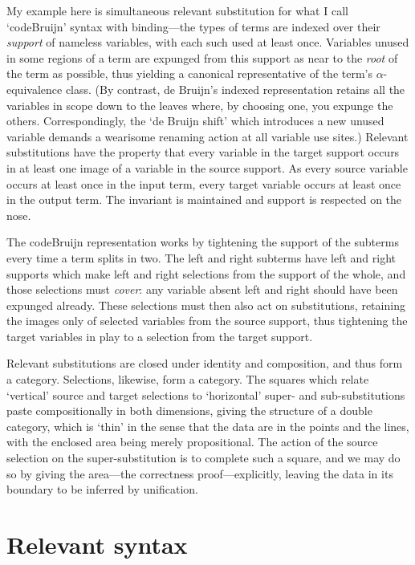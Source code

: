 \documentclass[orivec]{jfp}
\begin{document}
My example here is simultaneous relevant substitution for what I call
`codeBruijn' syntax with binding---the types of terms are indexed over
their \emph{support} of nameless variables, with each such used at
least once. Variables unused in some regions of a term are expunged
from this support as near to the \emph{root} of the term as possible,
thus yielding a canonical representative of the term's
$\alpha$-equivalence class. (By contrast, de Bruijn's indexed
representation retains all the variables in scope down to the leaves
where, by choosing one, you expunge the others. Correspondingly, the
`de Bruijn shift' which introduces a new unused variable demands a
wearisome renaming action at all variable use sites.) Relevant
substitutions have the property that every variable in the target
support occurs in at least one image of a variable in the source
support. As every source variable occurs at least once in the input
term, every target variable occurs at least once in the output
term. The invariant is maintained and support is respected on the
nose.

The codeBruijn representation works by tightening the support of the
subterms every time a term splits in two. The left and right subterms
have left and right supports which make left and right selections from
the support of the whole, and those selections must \emph{cover}: any
variable absent left and right should have been expunged
already. These selections must then also act on substitutions,
retaining the images only of selected variables from the source
support, thus tightening the target variables in play to a selection
from the target support.

Relevant substitutions are closed under identity and composition, and
thus form a category. Selections, likewise, form a category. The
squares which relate `vertical' source and target selections to
`horizontal' super- and sub-substitutions paste compositionally in
both dimensions, giving the structure of a double category, which is
`thin' in the sense that the data are in the points and the lines,
with the enclosed area being merely propositional. The action of the
source selection on the super-substitution is to complete such a
square, and we may do so by giving the area---the correctness
proof---explicitly, leaving the data in its boundary to be inferred by
unification.





\section{Relevant syntax}
\end{document}
